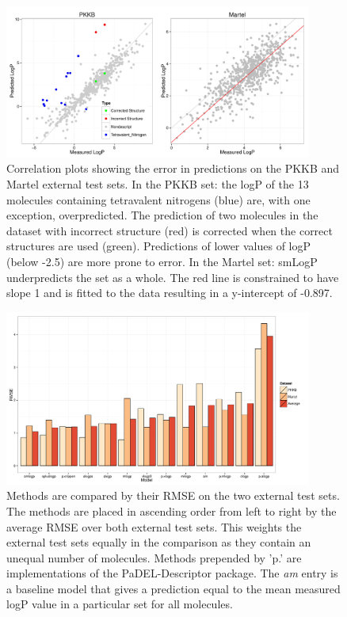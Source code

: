 \documentclass[10pt]{bmc_article}
\newenvironment{bmcformat}{\begin{raggedright}\baselineskip20pt\sloppy\setboolean{publ}{false}}{\end{raggedright}\baselineskip20pt\sloppy}
\begin{document}
\begin{bmcformat}
\begin{figure}[ht]
  \centering
  \includegraphics[width=0.9\textwidth]{./Figures/error_analysis_both.pdf}
  \caption{Correlation plots showing the error in predictions on the PKKB and Martel external test sets. In the PKKB set: the logP of the 13 molecules containing tetravalent nitrogens (blue) are, with one exception, overpredicted. The prediction of two molecules in the dataset with incorrect structure (red) is corrected when the correct structures are used (green). Predictions of lower values of logP (below -2.5) are more prone to error. In the Martel set: smLogP underpredicts the set as a whole. The red line is constrained to have slope 1 and is fitted to the data resulting in a y-intercept of -0.897.}
  \label{fig:error_analysis_both}
\end{figure}  

\begin{figure}[ht]
  \centering
  \includegraphics[width=0.9\textwidth]{./Figures/comparison.pdf}
  \caption{Methods are compared by their RMSE on the two external test sets. The methods are placed in ascending order from left to right by the average RMSE over both external test sets. This weights the external test sets equally in the comparison as they contain an unequal number of molecules. Methods prepended by 'p.' are implementations of the PaDEL-Descriptor package. The \textit{am} entry is a baseline model that gives a prediction equal to the mean measured logP value in a particular set for all molecules.}
  \label{fig:comparison}
\end{figure}  


\end{bmcformat}
\end{document}
